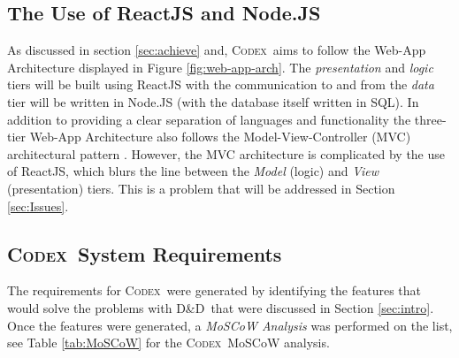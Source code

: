 \documentclass[progress]{cmpreport}
\newcommand{\dnd}{D\&D}
\newcommand{\Codex}{\textsc{Codex}}
\begin{document}
		\subsection{The Use of ReactJS and Node.JS} \label{sec:languages}
		As discussed in section \ref{sec:achieve} and, \Codex \ aims to follow the Web-App Architecture displayed in Figure \ref{fig:web-app-arch}. The \emph{presentation} and \emph{logic} tiers will be built using ReactJS with the communication to and from the \emph{data} tier will be written in Node.JS (with the database itself written in SQL). In addition to providing a clear separation of languages and functionality the three-tier Web-App Architecture also follows the Model-View-Controller (MVC) architectural pattern \citep{ModelViewController}. However, the MVC architecture is complicated by the use of ReactJS, which blurs the line between the \emph{Model} (logic) and \emph{View} (presentation) tiers. This is a problem that will be addressed in Section \ref{sec:Issues}.
		
		\subsection{\Codex \ System Requirements} \label{sec:sys-req}
		The requirements for \Codex \ were generated by identifying the features that would solve the problems with \dnd \ that were discussed in Section \ref{sec:intro}. Once the features were generated, a \emph{MoSCoW Analysis} was performed on the list, see Table \ref{tab:MoSCoW} for the \Codex \ MoSCoW analysis.
		
\end{document}
